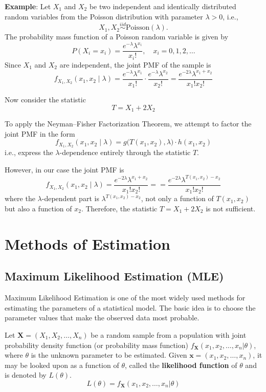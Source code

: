 \documentclass[twoside]{book}
\begin{document}
\begin{enumerate}
    \bigskip 
    
    \textbf{Example}: Let \( X_1 \) and \( X_2 \) be two independent and identically distributed random variables from the Poisson distribution with parameter \(\lambda > 0\), i.e., 
    \[
    X_1, X_2 \overset{iid}{\sim} \text{Poisson}(\lambda).
    \]
    The probability mass function of a Poisson random variable is given by
    \[
    P(X_i = x_i) = \frac{e^{-\lambda} \lambda^{x_i}}{x_i!}, \quad x_i = 0, 1, 2, \dots
    \]
    Since \(X_1\) and \(X_2\) are independent, the joint PMF of the sample is
    \[
    f_{X_1,X_2}(x_1, x_2 \mid \lambda) = \frac{e^{-\lambda} \lambda^{x_1}}{x_1!} \cdot \frac{e^{-\lambda} \lambda^{x_2}}{x_2!} 
    = \frac{e^{-2\lambda} \lambda^{x_1 + x_2}}{x_1! x_2!}
    \]
    
    Now consider the statistic
    \[
    T = X_1 + 2X_2
    \]
    
    To apply the Neyman–Fisher Factorization Theorem, we attempt to factor the joint PMF in the form
    \[
    f_{X_1,X_2}(x_1, x_2 \mid \lambda) = g\bigl(T(x_1, x_2), \lambda\bigr) \cdot h(x_1, x_2)
    \]
    i.e., express the \(\lambda\)-dependence entirely through the statistic \(T\).
    
    However, in our case the joint PMF is
    \[
    f_{X_1,X_2}(x_1, x_2 \mid \lambda) = \frac{e^{-2\lambda} \lambda^{x_1 + x_2}}{x_1! x_2!} = = \frac{e^{-2\lambda} \lambda^{T(x_1, x_2) - x_2}}{x_1! x_2!}
    \]
    where the \(\lambda\)-dependent part is \(\lambda^{T(x_1, x_2) - x_2}\), not only a function of $T(x_1, x_2)$ but also a function of $x_2$. 
    Therefore, the statistic \(T = X_1 + 2X_2\) is not sufficient.
    
    
\end{enumerate}

\section{Methods of Estimation}


\subsection{Maximum Likelihood Estimation (MLE)}

{Maximum Likelihood Estimation} is one of the most widely used methods for estimating the parameters of a statistical model. The basic idea is to choose the parameter values that make the observed data most probable.

Let \(\textbf{X} = ( X_1, X_2, \dots, X_n) \) be a random sample from a population with joint probability density function (or probability mass function) \( f_{\textbf{X}}(x_1, x_2, \dots, x_n | \theta) \), where \( \theta \) is the unknown parameter to be estimated. Given $\textbf{x} = (x_1, x_2, \dots, x_n)$, it may be looked upon as a function of $\theta$, called the \textbf{likelihood function} of $\theta$ and is denoted by $L(\theta)$. 
\[
L(\theta) = f_{\textbf{X}}(x_1, x_2, \dots, x_n | \theta)
\]
\end{document}
